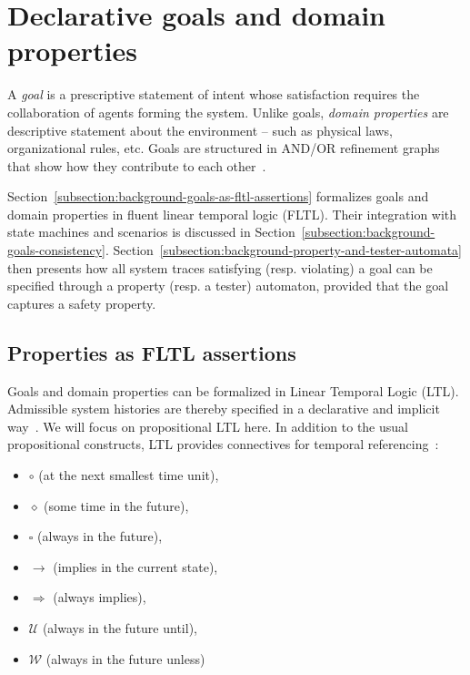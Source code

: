 \section{Declarative goals and domain properties\label{section:background-goals}}

A \emph{goal} is a prescriptive statement of intent whose satisfaction requires the collaboration of agents forming the system. Unlike goals, \emph{domain properties} are descriptive statement about the environment -- such as physical laws, organizational rules, etc. Goals are structured in AND/OR refinement graphs that show how they contribute to each other~\cite{VanLamsweerde:2000}.

Section~\ref{subsection:background-goals-as-fltl-assertions} formalizes goals and domain properties in fluent linear temporal logic (FLTL). Their integration with state machines and scenarios is discussed in Section~\ref{subsection:background-goals-consistency}. Section~\ref{subsection:background-property-and-tester-automata} then presents how all system traces satisfying (resp. violating) a goal can be specified through a property (resp. a tester) automaton, provided that the goal captures a safety property.

\subsection{Properties as FLTL assertions\label{subsection:background-goals-as-fltl-assertions}}

Goals and domain properties can be formalized in Linear Temporal Logic (LTL). Admissible system histories are thereby specified in a declarative and implicit way~\cite{VanLamsweerde:2009}. We will focus on propositional LTL here. In addition to the usual propositional constructs, LTL provides connectives for temporal referencing~\cite{Manna:1992}: 

\begin{itemize}
\item $\circ$ (at the next smallest time unit), 
\item $\diamond$ (some time in the future), 
\item $\square$ (always in the future), 
\item $\rightarrow$ (implies in the current state), 
\item $\Rightarrow$ (always implies), 
\item $\mathcal{U}$ (always in the future until), 
\item $\mathcal{W}$ (always in the future unless)
\end{itemize}

